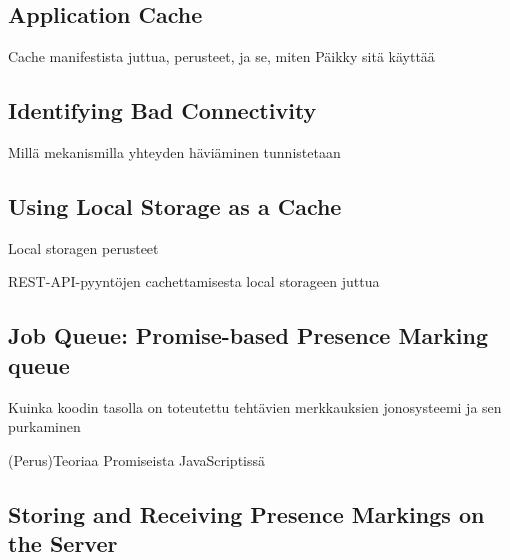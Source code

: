 \subsection{Application Cache}
Cache manifestista juttua, perusteet, ja se, miten Päikky sitä käyttää


\subsection{Identifying Bad Connectivity}
Millä mekanismilla yhteyden häviäminen tunnistetaan


\subsection{Using Local Storage as a Cache}
Local storagen perusteet

REST-API-pyyntöjen cachettamisesta local storageen juttua



\subsection{Job Queue: Promise-based Presence Marking queue}
Kuinka koodin tasolla on toteutettu tehtävien merkkauksien jonosysteemi ja sen purkaminen

(Perus)Teoriaa Promiseista JavaScriptissä


\subsection{Storing and Receiving Presence Markings on the Server}







